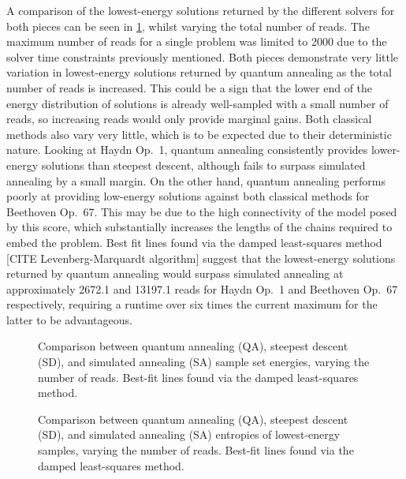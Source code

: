 \documentclass[12pt]{article}
\theoremstyle{definition}
\begin{document}
A comparison of the lowest-energy solutions returned by the different solvers for both pieces can be seen in \cref{fig:reads}, whilst varying the total number of reads. The maximum number of reads for a single problem was limited to \num{2000} due to the solver time constraints previously mentioned. Both pieces demonstrate very little variation in lowest-energy solutions returned by quantum annealing as the total number of reads is increased. This could be a sign that the lower end of the energy distribution of solutions is already well-sampled with a small number of reads, so increasing reads would only provide marginal gains. Both classical methods also vary very little, which is to be expected due to their deterministic nature.
Looking at Haydn Op.\ 1, quantum annealing consistently provides lower-energy solutions than steepest descent, although fails to surpass simulated annealing by a small margin. On the other hand, quantum annealing performs poorly at providing low-energy solutions against both classical methods for Beethoven Op.\ 67. This may be due to the high connectivity of the model posed by this score, which substantially increases the lengths of the chains required to embed the problem. Best fit lines found via the damped least-squares method [CITE Levenberg-Marquardt algorithm] suggest that the lowest-energy solutions returned by quantum annealing would surpass simulated annealing at approximately \num{2672.1} and \num{13197.1} reads for Haydn Op.\ 1 and Beethoven Op.\ 67 respectively, requiring a runtime over six times the current maximum for the latter to be advantageous.

\begin{figure}[h]
    \centering\footnotesize
    
    \caption{Comparison between quantum annealing (QA), steepest descent (SD), and simulated annealing (SA) sample set energies, varying the number of reads. Best-fit lines found via the damped least-squares method.}
    \label{fig:reads}
\end{figure}

\begin{figure}[h]
    \centering\footnotesize
    
    \caption{Comparison between quantum annealing (QA), steepest descent (SD), and simulated annealing (SA) entropies of lowest-energy samples, varying the number of reads. Best-fit lines found via the damped least-squares method.}
    \label{fig:entropy}
\end{figure}
\end{document}
